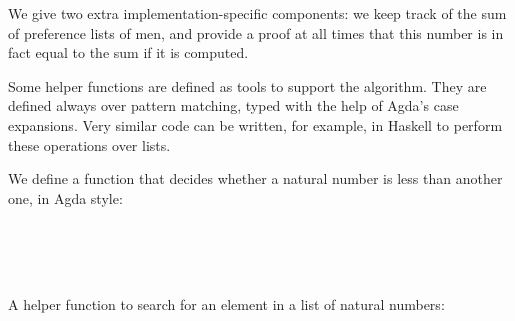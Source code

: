 {We give two extra implementation-specific components: we keep track of the sum of preference lists of men, and provide a proof at all times that this number is in fact equal to the sum if it is computed.

Some helper functions are defined as tools to support the algorithm. They are defined always over pattern matching, typed with the help of Agda's case expansions. Very similar code can be written, for example, in Haskell to perform these operations over lists.

We define a function that decides whether a natural number is less than another one, in Agda style:
\begin{code}%
\>[0]\AgdaSpace{}%
\AgdaSymbol{:}\AgdaSpace{}%
\AgdaSpace{}%
\AgdaSpace{}%
\AgdaSpace{}%
\AgdaSpace{}%
\<%
\\
\>[0]\AgdaSpace{}%
\AgdaSpace{}%
\AgdaSpace{}%
\AgdaSpace{}%
\AgdaSpace{}%
\AgdaSpace{}%
\<%
\\
\>[0]\AgdaSpace{}%
\AgdaSymbol{|}\AgdaSpace{}%
\AgdaSpace{}%
\AgdaSymbol{\AgdaUnderscore{}}\AgdaSpace{}%
\AgdaSymbol{=}\AgdaSpace{}%
\<%
\\
\>[0]\AgdaSpace{}%
\AgdaSymbol{|}\AgdaSpace{}%
\AgdaSpace{}%
\AgdaSymbol{\AgdaUnderscore{}}\AgdaSpace{}%
\AgdaSymbol{=}\AgdaSpace{}%
\<%
\end{code}

A helper function to search for an element in a list of natural numbers:

}
